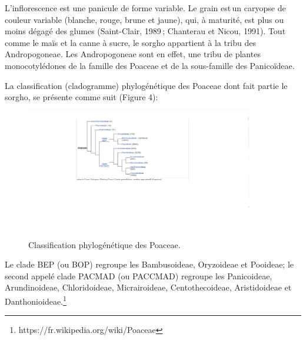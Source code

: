 \documentclass[a4paper,11pt]{article}
\begin{document}
L’inflorescence est une panicule de forme variable. Le grain est\,un
caryopse de couleur variable (blanche, rouge, brune et jaune), qui, à
maturité, est plus ou moins dégagé des glumes (Saint-Clair, 1989\,;
Chanterau et Nicou, 1991).  Tout comme le maïs et la canne à sucre, le
sorgho appartient à la tribu des Andropogoneae. Les Andropogoneae sont
en effet, une tribu de plantes monocotylédones de la famille des
Poaceae et de la sous-famille des Panicoïdeae.

La classification (cladogramme) phylogénétique des Poaceae dont fait
partie le sorgho, se présente comme suit (Figure 4):



\begin{figure}%
  \begin{center}
    \includegraphics[width=10cm]{images/PhylogenyPoacea}
  \end{center}
\caption{Classification phylogénétique des Poaceae.}
\end{figure}


Le clade BEP (ou BOP) regroupe les Bambusoideae, Oryzoideae et
Pooideae; le second appelé clade PACMAD (ou PACCMAD) regroupe les
Panicoideae, Arundinoideae, Chloridoideae, Micrairoideae,
Centothecoideae, Aristidoideae et
Danthonioideae.\footnote{https://fr.wikipedia.org/wiki/Poaceae}
\end{document}
